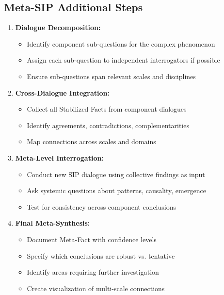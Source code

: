 \documentclass[11pt,a4paper]{article}
\begin{document}
\subsection*{Meta-SIP Additional Steps}
\begin{enumerate}[leftmargin=*, resume]
    \item \textbf{Dialogue Decomposition:}
    \begin{itemize}[nosep]
        \item Identify component sub-questions for the complex phenomenon
        \item Assign each sub-question to independent interrogators if possible
        \item Ensure sub-questions span relevant scales and disciplines
    \end{itemize}
    
    \item \textbf{Cross-Dialogue Integration:}
    \begin{itemize}[nosep]
        \item Collect all Stabilized Facts from component dialogues
        \item Identify agreements, contradictions, complementarities
        \item Map connections across scales and domains
    \end{itemize}
    
    \item \textbf{Meta-Level Interrogation:}
    \begin{itemize}[nosep]
        \item Conduct new SIP dialogue using collective findings as input
        \item Ask systemic questions about patterns, causality, emergence
        \item Test for consistency across component conclusions
    \end{itemize}
    
    \item \textbf{Final Meta-Synthesis:}
    \begin{itemize}[nosep]
        \item Document Meta-Fact with confidence levels
        \item Specify which conclusions are robust vs. tentative
        \item Identify areas requiring further investigation
        \item Create visualization of multi-scale connections
    \end{itemize}
\end{enumerate}
\end{document}
